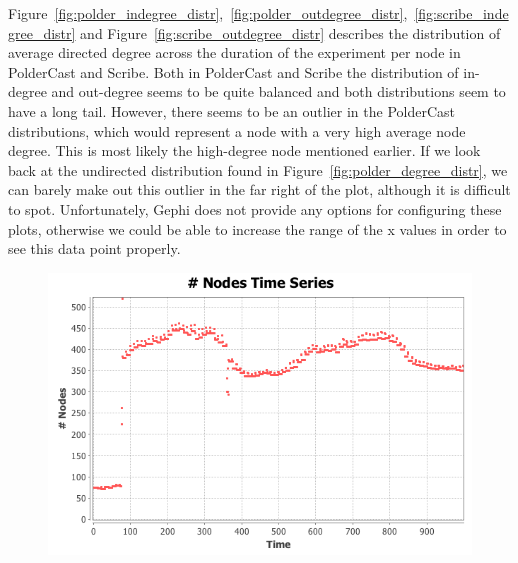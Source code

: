 Figure~\ref{fig:polder_indegree_distr},~\ref{fig:polder_outdegree_distr},~\ref{fig:scribe_indegree_distr}
and Figure~\ref{fig:scribe_outdegree_distr} describes the distribution
of average directed degree across the duration of the experiment per
node in PolderCast and Scribe. Both in PolderCast and Scribe the
distribution of in-degree and out-degree seems to be quite balanced and
both distributions seem to have a long tail. However, there seems to be
an outlier in the PolderCast distributions, which would represent a node
with a very high average node degree. This is most likely the
high-degree node mentioned earlier. If we look back at the undirected
distribution found in Figure~\ref{fig:polder_degree_distr}, we can
barely make out this outlier in the far right of the plot, although it
is difficult to spot.  Unfortunately, Gephi does not provide any options
for configuring these plots, otherwise we could be able to increase the
range of the x values in order to see this data point properly.

\begin{figure}[Ht]
    \centering
    \includegraphics[scale=0.5]{plots/polder_nodes_ts}
    \label{fig:polder_node_ts}
\end{figure}

